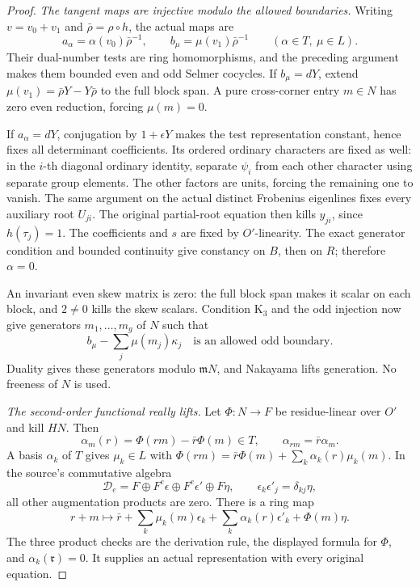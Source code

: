 \begin{proof}
\emph{The tangent maps are injective modulo the allowed boundaries.}
Writing \(v=v_0+v_1\) and \(\bar\rho=\rho\circ h\), the actual maps are
\[
 a_\alpha=\alpha(v_0)\bar\rho^{-1},\qquad
 b_\mu=\mu(v_1)\bar\rho^{-1}\qquad(\alpha\in T,\ \mu\in L).
\]
Their dual-number tests are ring homomorphisms, and the preceding
argument makes them bounded even and odd Selmer cocycles.
If \(b_\mu=dY\), extend
\(\mu(v_1)=\bar\rho Y-Y\bar\rho\) to the full block span.
A pure cross-corner entry \(m\in N\) has zero even reduction,
forcing \(\mu(m)=0\).

If \(a_\alpha=dY\), conjugation by \(1+\epsilon Y\) makes the
test representation constant, hence fixes all determinant
coefficients.  Its ordered ordinary characters are fixed as well:
in the \(i\)-th diagonal ordinary identity, separate \(\psi_i\)
from each other character using separate group elements.  The
other factors are units, forcing the remaining one to vanish.
The same argument on the actual distinct Frobenius eigenlines
fixes every auxiliary root \(U_{ji}\).  The original partial-root
equation then kills \(y_{ji}\), since \(h(\tau_j)=1\).
The coefficients and \(s\) are fixed by \(O'\)-linearity.
The exact generator condition and bounded continuity give
constancy on \(B\), then on \(R\); therefore \(\alpha=0\).

An invariant even skew matrix is zero: the full block span makes
it scalar on each block, and \(2\ne0\) kills the skew scalars.
Condition \(\mathrm K_3\) and the odd injection now give generators
\(m_1,\ldots,m_g\) of \(N\) such that
\[
 b_\mu-\sum_j\mu(m_j)\kappa_j
                    \quad\text{is an allowed odd boundary}.
\]
Duality gives these generators modulo \(\mathfrak mN\), and
Nakayama lifts generation.  No freeness of \(N\) is used.

\emph{The second-order functional really lifts.}
Let \(\Phi:N\to F\) be residue-linear over \(O'\) and kill \(HN\).
Then
\[
 \alpha_m(r)=\Phi(rm)-\bar r\Phi(m)\in T,\qquad
 \alpha_{rm}=\bar r\alpha_m.
\]
A basis \(\alpha_k\) of \(T\) gives \(\mu_k\in L\) with
\(\Phi(rm)=\bar r\Phi(m)+\sum_k\alpha_k(r)\mu_k(m)\).
In the source's commutative algebra
\[
 \mathcal D_e=F\oplus F^e\epsilon\oplus F^e\epsilon'\oplus F\eta,
 \qquad \epsilon_k\epsilon'_j=\delta_{kj}\eta,
\]
all other augmentation products are zero.  There is a ring map
\[
 r+m\longmapsto
 \bar r+\sum_k\mu_k(m)\epsilon_k+
              \sum_k\alpha_k(r)\epsilon'_k+\Phi(m)\eta.
\]
The three product checks are the derivation rule, the displayed
formula for \(\Phi\), and \(\alpha_k(\mathfrak r)=0\).
It supplies an actual representation with every original equation.


\end{proof}
